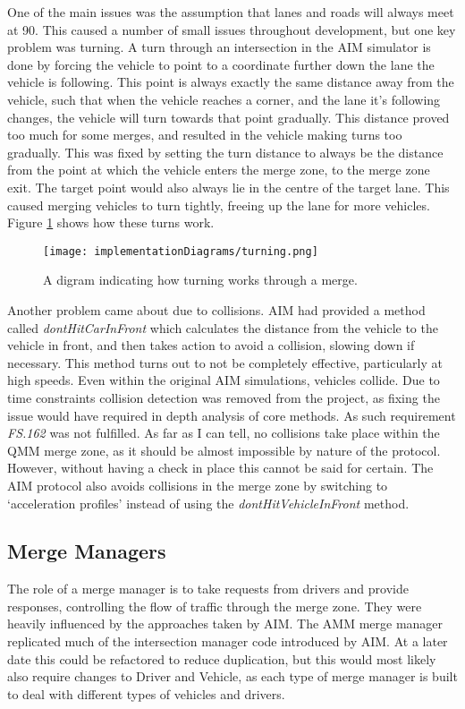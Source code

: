 One of the main issues was the assumption that lanes and roads will always meet at 90\degree. This caused a number of small issues throughout development, but one key problem was turning. A turn through an intersection in the AIM simulator is done by forcing the vehicle to point to a coordinate further down the lane the vehicle is following. This point is always exactly the same distance away from the vehicle, such that when the vehicle reaches a corner, and the lane it's following changes, the vehicle will turn towards that point gradually. This distance proved too much for some merges, and resulted in the vehicle making turns too gradually. This was fixed by setting the turn distance to always be the distance from the point at which the vehicle enters the merge zone, to the merge zone exit. The target point would also always lie in the centre of the target lane. This caused merging vehicles to turn tightly, freeing up the lane for more vehicles. Figure \ref{fig:turning} shows how these turns work.

\begin{figure}[htb]
\texttt{[image: implementationDiagrams/turning.png]}
\caption{A digram indicating how turning works through a merge.}
\label{fig:turning}
\end{figure}

Another problem came about due to collisions. AIM had provided a method called \emph{dontHitCarInFront} which calculates the distance from the vehicle to the vehicle in front, and then takes action to avoid a collision, slowing down if necessary. This method turns out to not be completely effective, particularly at high speeds. Even within the original AIM simulations, vehicles collide. Due to time constraints collision detection was removed from the project, as fixing the issue would have required in depth analysis of core methods. As such requirement \emph{FS.162} was not fulfilled. As far as I can tell, no collisions take place within the QMM merge zone, as it should be almost impossible by nature of the protocol. However, without having a check in place this cannot be said for certain. The AIM protocol also avoids collisions in the merge zone by switching to `acceleration profiles' instead of using the \emph{dontHitVehicleInFront} method.

\subsection{Merge Managers}
\label{subsec:Merge Managers}
The role of a merge manager is to take requests from drivers and provide responses, controlling the flow of traffic through the merge zone. They were heavily influenced by the approaches taken by AIM. The AMM merge manager replicated much of the intersection manager code introduced by AIM. At a later date this could be refactored to reduce duplication, but this would most likely also require changes to Driver and Vehicle, as each type of merge manager is built to deal with different types of vehicles and drivers.

